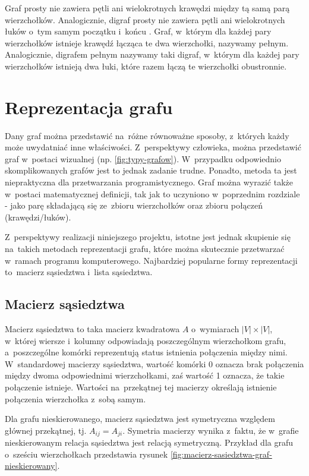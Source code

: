 \documentclass[11pt,a4paper,oneside]{report}
\begin{document}
Graf prosty nie zawiera pętli ani wielokrotnych krawędzi między tą samą parą wierzchołków. Analogicznie, digraf prosty nie zawiera pętli ani wielokrotnych łuków o~tym samym początku i~końcu \cite{wilson-1996-introductiontographtheory}. Graf, w~którym dla każdej pary wierzchołków istnieje krawędź łącząca te dwa wierzchołki, nazywamy pełnym. Analogicznie, digrafem pełnym nazywamy taki digraf, w~którym dla każdej pary wierzchołków istnieją dwa łuki, które razem łączą te wierzchołki obustronnie.

\section{Reprezentacja grafu}

Dany graf można przedstawić na~różne równoważne sposoby, z~których każdy może uwydatniać inne właściwości. Z~perspektywy człowieka, można przedstawić graf w~postaci wizualnej (np. \ref{fig:typy-grafow}). W~przypadku odpowiednio skomplikowanych grafów jest to jednak zadanie trudne. Ponadto, metoda ta jest niepraktyczna dla przetwarzania programistycznego. Graf można wyrazić także w~postaci matematycznej definicji, tak jak to uczyniono w~poprzednim rozdziale - jako parę składającą się ze~zbioru wierzchołków oraz zbioru połączeń (krawędzi/łuków).

Z~perspektywy realizacji niniejszego projektu, istotne jest jednak skupienie się na~takich metodach reprezentacji grafu, które można skutecznie przetwarzać w~ramach programu komputerowego. Najbardziej popularne formy reprezentacji to~macierz sąsiedztwa i~lista sąsiedztwa.

\subsection{Macierz sąsiedztwa}

Macierz sąsiedztwa to taka macierz kwadratowa $A$ o~wymiarach $|V| \times |V|$, w~której wiersze i~kolumny odpowiadają poszczególnym wierzchołkom grafu, a~poszczególne komórki reprezentują status istnienia połączenia między nimi. W~standardowej macierzy sąsiedztwa, wartość komórki 0 oznacza brak połączenia między dwoma odpowiednimi wierzchołkami, zaś wartość 1 oznacza, że takie połączenie istnieje. Wartości na~przekątnej tej macierzy określają istnienie połączenia wierzchołka z~sobą samym.

Dla grafu nieskierowanego, macierz sąsiedztwa jest symetryczna względem głównej przekątnej, tj. $A_{ij}=A_{ji}$. Symetria macierzy wynika z~faktu, że w~grafie nieskierowanym relacja sąsiedztwa jest relacją symetryczną. Przykład dla grafu o~sześciu wierzchołkach przedstawia rysunek \ref{fig:macierz-sasiedztwa-graf-nieskierowany}.
\end{document}
